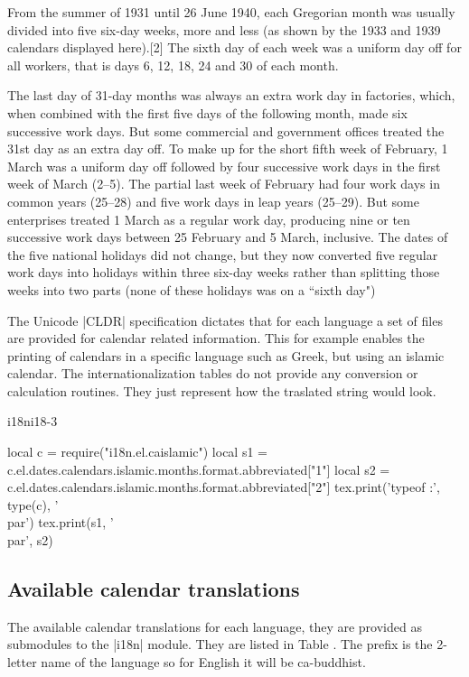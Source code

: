 From the summer of 1931 until 26 June 1940, each Gregorian month was usually divided into five six-day weeks, more and less (as shown by the 1933 and 1939 calendars displayed here).[2] The sixth day of each week was a uniform day off for all workers, that is days 6, 12, 18, 24 and 30 of each month. 

The last day of 31-day months was always an extra work day in factories, which, when combined with the first five days of the following month, made six successive work days. But some commercial and government offices treated the 31st day as an extra day off. To make up for the short fifth week of February, 1 March was a uniform day off followed by four successive work days in the first week of March (2–5). The partial last week of February had four work days in common years (25–28) and five work days in leap years (25–29). But some enterprises treated 1 March as a regular work day, producing nine or ten successive work days between 25 February and 5 March, inclusive. The dates of the five national holidays did not change, but they now converted five regular work days into holidays within three six-day weeks rather than splitting those weeks into two parts (none of these holidays was on a ``sixth day")


The Unicode |CLDR| specification dictates that for each language a set of files are provided for calendar related information. This for example enables the printing of calendars in a specific language such as Greek, but using an islamic calendar.  The internationalization tables do not provide any conversion or calculation routines. They just represent how the traslated string would look. 

\begin{texexample}{i18n}{i18-3}
\begin{luacode}
local c = require("i18n.el.caislamic")
local s1 = c.el.dates.calendars.islamic.months.format.abbreviated["1"]
local s2 = c.el.dates.calendars.islamic.months.format.abbreviated["2"]
tex.print('typeof :', type(c), '\\par')
tex.print(s1, '\\par', s2)
\end{luacode}
\end{texexample}

\subsection{Available calendar translations}

The available calendar translations for each language, they are provided as submodules to the |i18n| module. They are listed in Table    . The prefix is the 2-letter name of the language so for English it will be ca-buddhist.

